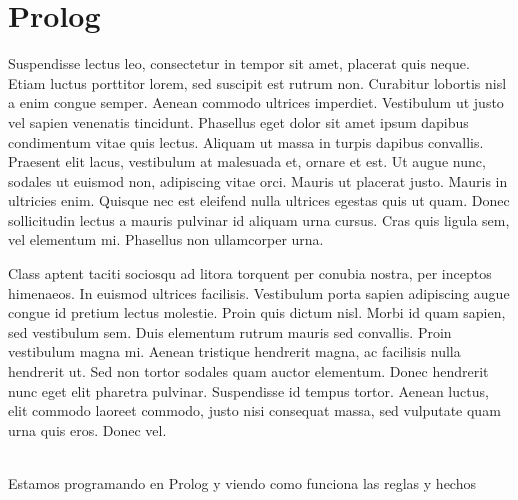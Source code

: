 \chapter{Prolog}
\label{ch:prolog}

Suspendisse lectus leo, consectetur in tempor sit amet, placerat quis neque. Etiam luctus porttitor lorem, sed suscipit est rutrum non. Curabitur lobortis nisl a enim congue semper. Aenean commodo ultrices imperdiet. Vestibulum ut justo vel sapien venenatis tincidunt. Phasellus eget dolor sit amet ipsum dapibus condimentum vitae quis lectus. Aliquam ut massa in turpis dapibus convallis. Praesent elit lacus, vestibulum at malesuada et, ornare et est. Ut augue nunc, sodales ut euismod non, adipiscing vitae orci. Mauris ut placerat justo. Mauris in ultricies enim. Quisque nec est eleifend nulla ultrices egestas quis ut quam. Donec sollicitudin lectus a mauris pulvinar id aliquam urna cursus. Cras quis ligula sem, vel elementum mi. Phasellus non ullamcorper urna.\cite{PrologBratko}


Class aptent taciti sociosqu ad litora torquent per conubia nostra, per inceptos himenaeos. In euismod ultrices facilisis. Vestibulum porta sapien adipiscing augue congue id pretium lectus molestie. Proin quis dictum nisl. Morbi id quam sapien, sed vestibulum sem. Duis elementum rutrum mauris sed convallis. Proin vestibulum magna mi. Aenean tristique hendrerit magna, ac facilisis nulla hendrerit ut. Sed non tortor sodales quam auctor elementum. Donec hendrerit nunc eget elit pharetra pulvinar. Suspendisse id tempus tortor. Aenean luctus, elit commodo laoreet commodo, justo nisi consequat massa, sed vulputate quam urna quis eros. Donec vel. 

\\

Estamos programando en Prolog y viendo como funciona las reglas y hechos